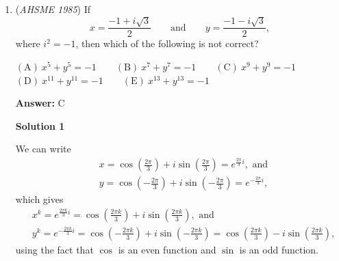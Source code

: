 \begin{enumerate}
$\mathrm{(A)\ } 3 \qquad \mathrm{(B) \ }3+\sqrt{3} \qquad \mathrm{(C) \  } 5-\frac{\sqrt{3}}{2} \qquad \mathrm{(D) \  } 5 \qquad \mathrm{(E) \  }\text{none of the above}$

 \textbf{Answer: }D



\textbf{Solution}

Since $\angle CAD$ is an angle inscribed in a $60{^\circ}$ arc, we obtain $\angle CAD =\frac{60^{\circ}}{2} = 30^{\circ}$, so $\triangle ABO$ is a $30^{\circ}$-$60^{\circ}$-$90^{\circ}$ right triangle. This gives $AO = BO\sqrt{3} = 5\sqrt{3}$ and $AB = 2BO = 10$, and now since $AD$ is a diameter, $AD = 2AO = 10\sqrt{3}$. The fact that $AD$ is a diameter also means that $\angle ACD = 90^{\circ}$, so $\triangle ACD$ is again a $30^{\circ}$-$60^{\circ}$-$90^{\circ}$ right triangle, yielding $CD = \frac{1}{2}AD = 5\sqrt{3}$ and $AC = \frac{\sqrt{3}}{2}AD = 15$, which finally gives $BC = AC-AB = 15-10 = \boxed{\text{(D)} \ 5}$.

 


	\item (\textit{AHSME 1985}) If 
 \[x = \frac{-1+i\sqrt{3}}{2} \qquad\text{and}\qquad y = \frac{-1-i\sqrt{3}}{2},\] where $i^2 = -1$, then which of the following is not correct?


 $\mathrm{(A)\ } x^5+y^5 = -1 \qquad \mathrm{(B) \ }x^7+y^7 = -1 \qquad \mathrm{(C) \  } x^9+y^9 = -1 \qquad$
$\mathrm{(D) \  } x^{11}+y^{11} = -1 \qquad \mathrm{(E) \  }x^{13}+y^{13} = -1$

 \textbf{Answer: }C



\textbf{Solution 1}

We can write 
 \begin{align*}&x = \cos\left(\frac{2\pi}{3}\right)+i\sin\left(\frac{2\pi}{3}\right) = e^{\frac{2\pi}{3}i}, \text{ and} \\ &y = \cos\left(-\frac{2\pi}{3}\right)+i\sin\left(-\frac{2\pi}{3}\right) = e^{-\frac{2\pi}{3}i},\end{align*}
 which gives 
 \begin{align*}&x^k = e^{\frac{2\pi k}{3}i} = \cos\left(\frac{2\pi k}{3}\right)+i\sin\left(\frac{2\pi k}{3}\right), \text{ and} \\ &y^k = e^{-\frac{2\pi k}{3}i} = \cos\left(-\frac{2\pi k}{3}\right)+i\sin\left(-\frac{2\pi k}{3}\right) = \cos\left(\frac{2\pi k}{3}\right)-i\sin\left(\frac{2\pi k}{3}\right),\end{align*}
 using the fact that $\cos$ is an even function and $\sin$ is an odd function.


\end{enumerate}
